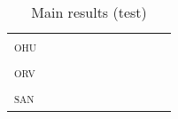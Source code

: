 \documentclass{../acl_latex.tex}
\begin{document}
\begin{table*}[t]
\begin{tabular}{lrrrrrrrrr}
\textsc{ohu}     &                   &                      &                  &                   &                      &                 &                   &                      &                \\
\textsc{orv}     &                   &                      &                  &                   &                      &                 &                   &                      &                \\
\textsc{san}     &                   &                      &                  &                   &                      &                 &                   &                      &                \\ \bottomrule 
\end{tabular}
\caption{
    Main results (test)
}
\end{table*}
\end{document}
